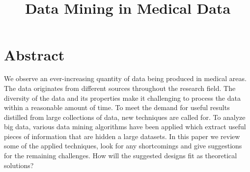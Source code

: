 

\renewcommand{\baselinestretch}{1.2} 

\def \thetitle {INF-3701 - Advanced Database Systems}
\def \thesubtitle {Assignment 2}
\def \theauthor {Thomas B Nilsen and Valter Berg}
\def \pagecount {6}


\pagestyle{fancyplain} %
\renewcommand{\headrulewidth}{1pt} %
\renewcommand{\footrulewidth}{0pt}
\lfoot{}\cfoot{Page {\thepage} of \pagecount}\rfoot{}



\title{Data Mining in Medical Data}

\author{
\and
{}
}
\maketitle





\setcounter{page}{1}

\section{Abstract}

We observe an ever-increasing quantity of data being produced in medical areas. The data originates from different sources throughout the research field. The diversity of the data and its properties make it challenging to process the data within a reasonable amount of time. To meet the demand for useful results distilled from large collections of data, new techniques are called for. To analyze big data, various data mining algorithms have been applied which extract useful pieces of information that are hidden a large datasets. In this paper we review some of the applied techniques, look for any shortcomings and give suggestions for the remaining challenges. How will the suggested designs fit as theoretical solutions?


